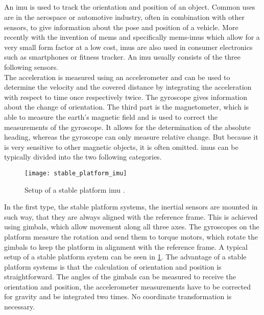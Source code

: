 \subsection{}
An \gls{imu} is used to track the orientation and position of an object.
Common uses are in the aerospace or automotive industry, often in combination with other sensors, to give information about the pose and position of a vehicle.
More recently with the invention of \gls{mems} and specifically \gls{mems}-\glspl{imu} which allow for a very small form factor at a low cost, \glspl{imu} are also used in consumer electronics such as smartphones or fitness tracker.
An \gls{imu} usually consists of the three following sensors.\\
The acceleration is measured using an accelerometer and can be used to determine the velocity and the covered distance by integrating the acceleration with respect to time once respectively twice.
The gyroscope gives information about the change of orientation.
The third part is the magnetometer, which is able to measure the earth's magnetic field and is used to correct the measurements of the gyroscope.
It allows for the determination of the absolute heading, whereas the gyroscope can only measure relative change. But because it is very sensitive to other magnetic objects, it is often omitted.
\glspl{imu} can be typically divided into the two following categories.\\
\begin{figure}[htb]
	\centering
	\texttt{[image: stable\_platform\_imu]}
	\caption[Setup of a stable platform \acrshort{imu}]{Setup of a stable platform \acrshort{imu} \cite{Woodman2007}.}
	\label{fig:stable_platform_imu}
\end{figure}
In the first type, the stable platform systems, the inertial sensors are mounted in such way, that they are always aligned with the reference frame.
This is achieved using gimbals, which allow movement along all three axes.
The gyroscopes on the platform measure the rotation and send them to torque motors, which rotate the gimbals to keep the platform in alignment with the reference frame.
A typical setup of a stable platform system can be seen in \cref{fig:stable_platform_imu}.
The advantage of a stable platform systems is that the calculation of orientation and position is straightforward.
The angles of the gimbals can be measured to receive the orientation and position, the accelerometer measurements have to be corrected for gravity and be integrated two times.
No coordinate transformation is necessary.
